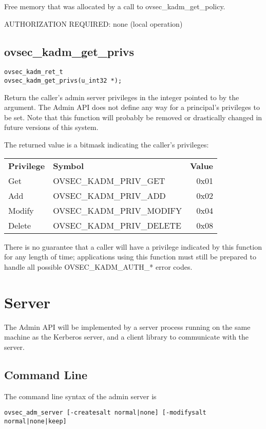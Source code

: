 Free memory that was allocated by a call to ovsec_kadm_get_policy.

AUTHORIZATION REQUIRED: none (local operation)

\subsection{ovsec_kadm_get_privs}

\begin{verbatim}
ovsec_kadm_ret_t
ovsec_kadm_get_privs(u_int32 *);
\end{verbatim}

Return the caller's admin server privileges in the integer pointed to
by the argument.  The Admin API does not define any way for a
principal's privileges to be set.  Note that this function will
probably be removed or drastically changed in future versions of this
system.

The returned value is a bitmask indicating the caller's privileges:

\begin{tabular}{llr}
{\bf Privilege} & {\bf Symbol} & {\bf Value} \\
Get & OVSEC_KADM_PRIV_GET & 0x01 \\
Add & OVSEC_KADM_PRIV_ADD & 0x02 \\
Modify & OVSEC_KADM_PRIV_MODIFY & 0x04 \\
Delete & OVSEC_KADM_PRIV_DELETE & 0x08
\end{tabular}

There is no guarantee that a caller will have a privilege indicated by
this function for any length of time; applications using this function
must still be prepared to handle all possible OVSEC_KADM_AUTH_* error
codes.

\section{Server}

The Admin API will be implemented by a server process running on the
same machine as the Kerberos server, and a client library to
communicate with the server.

\subsection{Command Line}
\label{sec:commandline}

The command line syntax of the admin server is

\begin{verbatim}
ovsec_adm_server [-createsalt normal|none] [-modifysalt normal|none|keep]
\end{verbatim}

